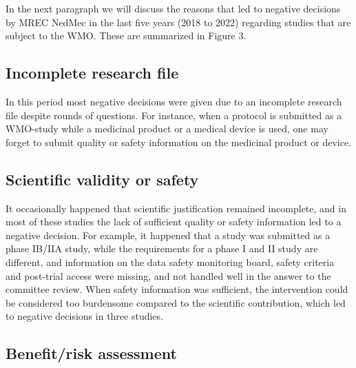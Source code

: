 \documentclass[authordate, empirical]{jote-new-article}
\begin{document}
	In the next paragraph we will discuss the reasons that led to negative decisions by MREC NedMec in the last five years (2018 to 2022) regarding studies that are subject to the WMO. These are summarized in Figure 3.







	\subsection{Incomplete research file}



	In this period most negative decisions were given due to an incomplete research file despite rounds of questions. For instance, when a protocol is submitted as a WMO-study while a medicinal product or a medical device is used, one may forget to submit quality or safety information on the medicinal product or device.







	\subsection{Scientific validity or safety}



	It occasionally happened that scientific justification remained incomplete, and in most of these studies the lack of sufficient quality or safety information led to a negative decision. For example, it happened that a study was submitted as a phase IB/IIA study, while the requirements for a phase I and II study are different, and information on the data safety monitoring board, safety criteria and post-trial access were missing, and not handled well in the answer to the committee review. When safety information was sufficient, the intervention could be considered too burdensome compared to the scientific contribution, which led to negative decisions in three studies.







	\subsection{Benefit/risk assessment}
\end{document}
